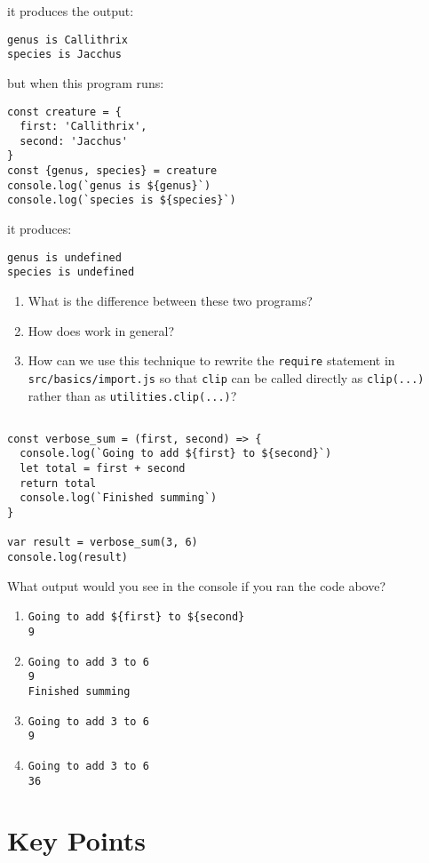 \noindent
it produces the output:

\begin{verbatim}
genus is Callithrix
species is Jacchus
\end{verbatim}

\noindent
but when this program runs:

\begin{verbatim}
const creature = {
  first: 'Callithrix',
  second: 'Jacchus'
}
const {genus, species} = creature
console.log(`genus is ${genus}`)
console.log(`species is ${species}`)
\end{verbatim}

\noindent
it produces:

\begin{verbatim}
genus is undefined
species is undefined
\end{verbatim}

\begin{enumerate}
\item
  What is the difference between these two programs?
\item
  How does  work in general?
\item
  How can we use this technique to rewrite the \texttt{require} statement in \texttt{src/basics/import.js}
  so that \texttt{clip} can be called directly as \texttt{clip(...)} rather than as \texttt{utilities.clip(...)}?
\end{enumerate}

\begin{verbatim}

const verbose_sum = (first, second) => {
  console.log(`Going to add ${first} to ${second}`)
  let total = first + second
  return total
  console.log(`Finished summing`)
}

var result = verbose_sum(3, 6)
console.log(result)
\end{verbatim}

What output would you see in the console if you ran the code above?

\begin{enumerate}
\item
  \texttt{Going\ to\ add\ \$\{first\}\ to\ \$\{second\}}\\
  \texttt{9}
\item
  \texttt{Going\ to\ add\ 3\ to\ 6}\\
  \texttt{9}\\
  \texttt{Finished\ summing}
\item
  \texttt{Going\ to\ add\ 3\ to\ 6}\\
  \texttt{9}
\item
  \texttt{Going\ to\ add\ 3\ to\ 6}\\
  \texttt{36}
\end{enumerate}

\section*{Key Points}


